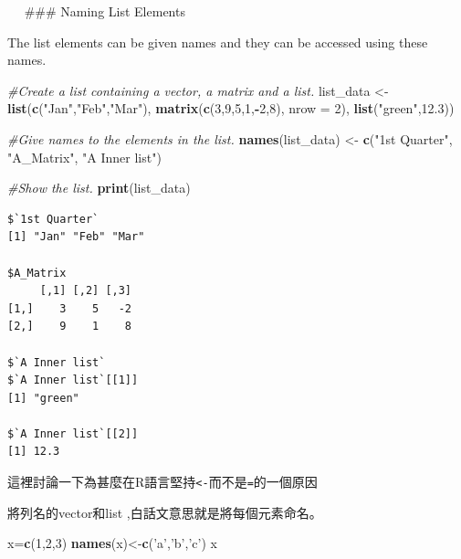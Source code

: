 \documentclass[]{book}
\newenvironment{Shaded}{\begin{snugshade}}{\end{snugshade}}
\newcommand{\CommentTok}[1]{\textcolor[rgb]{0.56,0.35,0.01}{\textit{#1}}}
\newcommand{\DataTypeTok}[1]{\textcolor[rgb]{0.13,0.29,0.53}{#1}}
\newcommand{\DecValTok}[1]{\textcolor[rgb]{0.00,0.00,0.81}{#1}}
\newcommand{\FloatTok}[1]{\textcolor[rgb]{0.00,0.00,0.81}{#1}}
\newcommand{\KeywordTok}[1]{\textcolor[rgb]{0.13,0.29,0.53}{\textbf{#1}}}
\newcommand{\NormalTok}[1]{#1}
\newcommand{\OperatorTok}[1]{\textcolor[rgb]{0.81,0.36,0.00}{\textbf{#1}}}
\newcommand{\StringTok}[1]{\textcolor[rgb]{0.31,0.60,0.02}{#1}}
\theoremstyle{definition}
\theoremstyle{definition}
\theoremstyle{definition}
\theoremstyle{remark}
\begin{document}
　 \#\#\# Naming List Elements

The list elements can be given names and they can be accessed using
these names.

\begin{Shaded}
\begin{Highlighting}[]
\CommentTok{#Create a list containing a vector, a matrix and a list.}
\NormalTok{list_data <-}\StringTok{ }\KeywordTok{list}\NormalTok{(}\KeywordTok{c}\NormalTok{(}\StringTok{"Jan"}\NormalTok{,}\StringTok{"Feb"}\NormalTok{,}\StringTok{"Mar"}\NormalTok{), }\KeywordTok{matrix}\NormalTok{(}\KeywordTok{c}\NormalTok{(}\DecValTok{3}\NormalTok{,}\DecValTok{9}\NormalTok{,}\DecValTok{5}\NormalTok{,}\DecValTok{1}\NormalTok{,}\OperatorTok{-}\DecValTok{2}\NormalTok{,}\DecValTok{8}\NormalTok{), }\DataTypeTok{nrow =} \DecValTok{2}\NormalTok{),}
   \KeywordTok{list}\NormalTok{(}\StringTok{"green"}\NormalTok{,}\FloatTok{12.3}\NormalTok{))}

\CommentTok{#Give names to the elements in the list.}
\KeywordTok{names}\NormalTok{(list_data) <-}\StringTok{ }\KeywordTok{c}\NormalTok{(}\StringTok{"1st Quarter"}\NormalTok{, }\StringTok{"A_Matrix"}\NormalTok{, }\StringTok{"A Inner list"}\NormalTok{)}

\CommentTok{#Show the list.}
\KeywordTok{print}\NormalTok{(list_data)}
\end{Highlighting}
\end{Shaded}

\begin{verbatim}
$`1st Quarter`
[1] "Jan" "Feb" "Mar"

$A_Matrix
     [,1] [,2] [,3]
[1,]    3    5   -2
[2,]    9    1    8

$`A Inner list`
$`A Inner list`[[1]]
[1] "green"

$`A Inner list`[[2]]
[1] 12.3
\end{verbatim}

這裡討論一下為甚麼在R語言堅持\texttt{\textless{}-}而不是\texttt{=}的一個原因

將列名的vector和list ,白話文意思就是將每個元素命名。

\begin{Shaded}
\begin{Highlighting}[]
\NormalTok{x=}\KeywordTok{c}\NormalTok{(}\DecValTok{1}\NormalTok{,}\DecValTok{2}\NormalTok{,}\DecValTok{3}\NormalTok{)}
\KeywordTok{names}\NormalTok{(x)<-}\KeywordTok{c}\NormalTok{(}\StringTok{'a'}\NormalTok{,}\StringTok{'b'}\NormalTok{,}\StringTok{'c'}\NormalTok{)}
\NormalTok{x}
\end{Highlighting}
\end{Shaded}
\end{document}
